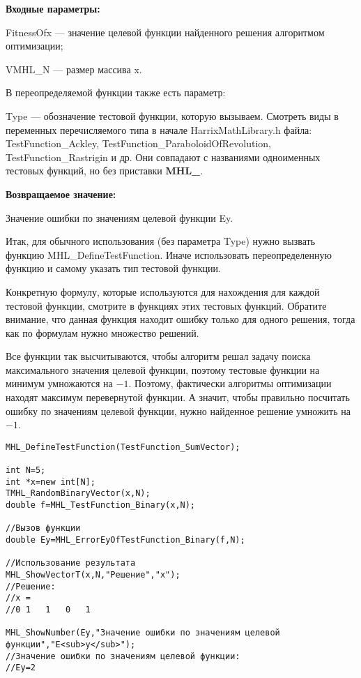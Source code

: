 \documentclass[a4paper,12pt]{article}
\begin{document}
\textbf{Входные параметры:}

FitnessOfx --- значение целевой функции найденного решения алгоритмом оптимизации;

VMHL\_N --- размер массива x.

В переопределяемой функции также есть параметр:
  
Type --- обозначение тестовой функции, которую вызываем.
Смотреть виды в переменных перечисляемого типа в начале HarrixMathLibrary.h файла: TestFunction\_Ackley, TestFunction\_ParaboloidOfRevolution, TestFunction\_Rastrigin и др. Они совпадают с названиями одноименных тестовых функций, но без приставки \textbf{MHL\_}.

\textbf{Возвращаемое значение:}
 
Значение ошибки по значениям целевой функции Ey.

Итак, для обычного использования (без параметра Type) нужно вызвать функцию MHL\_DefineTestFunction. Иначе использовать переопределенную функцию и самому указать тип тестовой функции.

Конкретную формулу, которые используются для нахождения для каждой тестовой функции, смотрите в функциях этих тестовых функций. Обратите внимание, что данная функция находит ошибку только для одного решения, тогда как по формулам нужно множество решений.

Все функции так высчитываются, чтобы алгоритм решал задачу поиска максимального значения целевой функции, поэтому тестовые функции на минимум умножаются на $-1$. Поэтому, фактически алгоритмы оптимизации находят максимум перевернутой функции. А значит, чтобы правильно посчитать ошибку по значениям целевой функции, нужно найденное решение умножить на $-1$.


\begin{lstlisting}[label=code_use_MHL_ErrorEyOfTestFunction_Binary,caption=Пример использования]
MHL_DefineTestFunction(TestFunction_SumVector);

int N=5;
int *x=new int[N];
TMHL_RandomBinaryVector(x,N);
double f=MHL_TestFunction_Binary(x,N);

//Вызов функции
double Ey=MHL_ErrorEyOfTestFunction_Binary(f,N);

//Использование результата
MHL_ShowVectorT(x,N,"Решение","x");
//Решение:
//x =	
//0	1	1	0	1

MHL_ShowNumber(Ey,"Значение ошибки по значениям целевой функции","E<sub>y</sub>");
//Значение ошибки по значениям целевой функции:
//Ey=2
\end{lstlisting}
\end{document}
